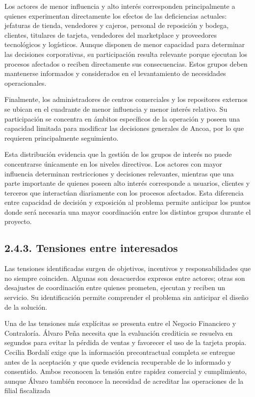 \documentclass[11pt]{article}
\begin{document}
Los actores de menor influencia y alto interés corresponden principalmente a quienes experimentan directamente los efectos de las deficiencias actuales: jefaturas de tienda, vendedores y cajeros, personal de reposición y bodega, clientes, titulares de tarjeta, vendedores del marketplace y proveedores tecnológicos y logísticos. Aunque disponen de menor capacidad para determinar las decisiones corporativas, su participación resulta relevante porque ejecutan los procesos afectados o reciben directamente sus consecuencias. Estos grupos deben mantenerse informados y considerados en el levantamiento de necesidades operacionales.

Finalmente, los administradores de centros comerciales y los repositores externos se ubican en el cuadrante de menor influencia y menor interés relativo. Su participación se concentra en ámbitos específicos de la operación y poseen una capacidad limitada para modificar las decisiones generales de Ancoa, por lo que requieren principalmente seguimiento.

Esta distribución evidencia que la gestión de los grupos de interés no puede concentrarse únicamente en los niveles directivos. Los actores con mayor influencia determinan restricciones y decisiones relevantes, mientras que una parte importante de quienes poseen alto interés corresponde a usuarios, clientes y terceros que interactúan diariamente con los procesos afectados. Esta diferencia entre capacidad de decisión y exposición al problema permite anticipar los puntos donde será necesaria una mayor coordinación entre los distintos grupos durante el proyecto.

\subsection{2.4.3. Tensiones entre interesados}\label{tensiones-entre-interesados}

Las tensiones identificadas surgen de objetivos, incentivos y responsabilidades que no siempre coinciden. Algunas son desacuerdos expresos entre actores; otras son desajustes de coordinación entre quienes prometen, ejecutan y reciben un servicio. Su identificación permite comprender el problema sin anticipar el diseño de la solución.

Una de las tensiones más explícitas se presenta entre el Negocio Financiero y Contraloría. Álvaro Peña necesita que la evaluación crediticia se resuelva en segundos para evitar la pérdida de ventas y favorecer el uso de la tarjeta propia. Cecilia Bordalí exige que la información precontractual completa se entregue antes de la aceptación y que quede evidencia recuperable de lo informado y consentido. Ambos reconocen la tensión entre rapidez comercial y cumplimiento, aunque Álvaro también reconoce la necesidad de acreditar las operaciones de la filial fiscalizada
\end{document}

